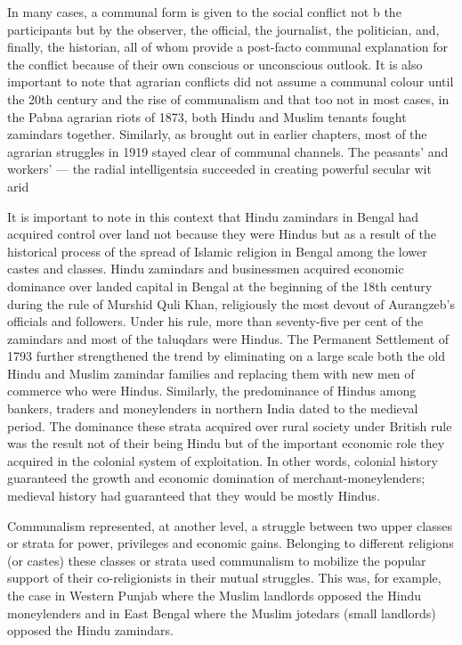 In many cases, a communal form is given to the social conflict not b the participants but by the observer, the official, the journalist, the politician, and, finally, the historian, all of whom provide a post-facto communal explanation for the conflict because of their own conscious or unconscious outlook. It is also important to note that agrarian conflicts did not assume a communal colour until the 20th century and the rise of communalism and that too not in most cases, in the Pabna agrarian riots of 1873, both Hindu and Muslim tenants fought zamindars together. Similarly, as brought out in earlier chapters, most of the agrarian struggles in 1919 stayed clear of communal channels. The peasants' and workers' --- the radial intelligentsia succeeded in creating powerful secular wit arid %

It is important to note in this context that Hindu zamindars in Bengal had acquired control over land not because they were Hindus but as a result of the historical process of the spread of Islamic religion in Bengal among the lower castes and classes. Hindu zamindars and businessmen acquired economic dominance over landed capital in Bengal at the beginning of the 18th century during the rule of Murshid Quli Khan, religiously the most devout of Aurangzeb's officials and followers. Under his rule, more than seventy-five per cent of the zamindars and most of the taluqdars were Hindus. The Permanent Settlement of 1793 further strengthened the trend by eliminating on a large scale both the old Hindu and Muslim zamindar families and replacing them with new men of commerce who were Hindus. Similarly, the predominance of Hindus among bankers, traders and moneylenders in northern India dated to the medieval period. The dominance these strata acquired over rural society under British rule was the result not of their being Hindu but of the important economic role they acquired in the colonial system of exploitation. In other words, colonial history guaranteed the growth and economic domination of merchant-moneylenders; medieval history had guaranteed that they would be mostly Hindus. 

Communalism represented, at another level, a struggle between two upper classes or strata for power, privileges and economic gains. Belonging to different religions (or castes) these classes or strata used communalism to mobilize the popular support of their co-religionists in their mutual struggles. This was, for example, the case in Western Punjab where the Muslim landlords opposed the Hindu moneylenders and in East Bengal where the Muslim jotedars (small landlords) opposed the Hindu zamindars.

